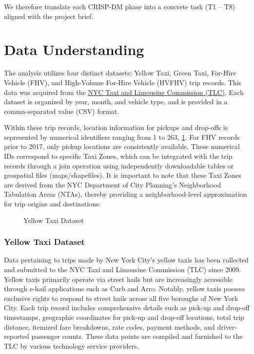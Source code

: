 \documentclass[conference]{IEEEtran}
\begin{document}
We therefore translate each CRISP-DM phase into a concrete task
(T1 – T8) aligned with the project brief.


\section{Data Understanding}
The analysis utilizes four distinct datasets: Yellow Taxi, Green Taxi, For-Hire Vehicle (FHV), and High-Volume
For-Hire Vehicle (HVFHV) trip records. This data was acquired from the
\href{https://www.nyc.gov/site/tlc/about/tlc-trip-record-data.page}{NYC Taxi and Limousine Commission (TLC)}.
Each dataset is organized by year, month, and vehicle type, and is provided in a comma-separated value (CSV) format.

Within these trip records, location information for pickups and drop-offs is represented by numerical identifiers
ranging from 1 to 263, \ref{fig:nyc-zones-map}. For FHV records prior to 2017, only pickup locations are consistently
available. These numerical IDs correspond to specific Taxi Zones, which can be integrated with the trip records through
a join operation using independently downloadable tables or geospatial files (maps/shapefiles). It is important to note
that these Taxi Zones are derived from the NYC Department of City Planning's Neighborhood Tabulation Areas (NTAs),
thereby providing a neighborhood-level approximation for trip origins and destinations.

\begin{figure}[htbp]
  \label{fig:nyc-zones-map}
  \centering
  
  \caption{Yellow Taxi Dataset}
\end{figure}

\subsubsection*{Yellow Taxi Dataset}
Data pertaining to trips made by New York City's yellow taxis has been collected and submitted to the NYC Taxi and
Limousine Commission (TLC) since 2009. Yellow taxis primarily operate via street hails but are increasingly accessible
through e-hail applications such as Curb and Arro. Notably, yellow taxis possess exclusive rights to respond to street
hails across all five boroughs of New York City.
Each trip record includes comprehensive details such as pick-up and drop-off timestamps, geographic coordinates for
pick-up and drop-off locations, total trip distance, itemized fare breakdowns, rate codes, payment methods, and
driver-reported passenger counts. These data points are compiled and furnished to the TLC by various technology
service providers.
\end{document}
